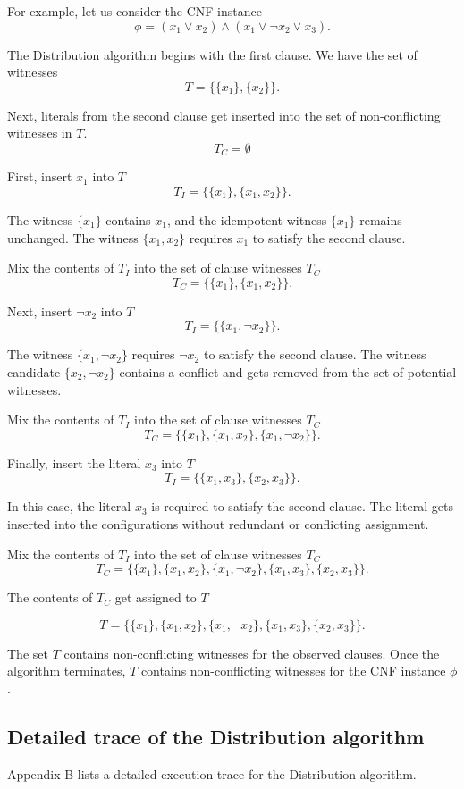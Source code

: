For example, let us consider the CNF instance
\[
\phi = (x_1 \vee x_2) \wedge (x_1 \vee \neg x_2 \vee x_3).
\]		

The Distribution algorithm begins with the first clause.  We have the set of witnesses
\[
T = \{ \{x_1\}, \{x_2\} \}.
\] 

Next, literals from the second clause get inserted into the set of non-conflicting witnesses in $T$.
\[
T_C = \emptyset
\]

\noindent First, insert $x_1$ into $T$
\[
T_I = \{ \{x_1\}, \{x_1, x_2\} \}.
\] 

\noindent The witness $\{x_1\}$ contains $x_1$, and the idempotent witness $\{x_1\}$ remains unchanged.  The witness $\{x_1, x_2\}$ requires $x_1$ to satisfy the second clause.

Mix the contents of $T_I$ into the set of clause witnesses $T_C$
\[
T_C = \{ \{x_1\}, \{x_1, x_2\} \}.
\]

\noindent Next, insert $\neg x_2$ into $T$
\[
T_I = \{ \{x_1, \neg x_2\} \}.
\] 

\noindent The witness $\{x_1, \neg x_2\}$ requires $\neg x_2$ to satisfy the second clause.  The witness candidate $\{x_2, \neg x_2\}$ contains a conflict and gets removed from the set of potential witnesses.

Mix the contents of $T_I$ into the set of clause witnesses $T_C$
\[
T_C = \{ \{x_1\}, \{x_1, x_2\}, \{x_1, \neg x_2\} \}.
\]

Finally, insert the literal $x_3$ into $T$
\[
T_I = \{ \{x_1, x_3\}, \{x_2, x_3\} \}.
\] 

\noindent In this case, the literal $x_3$ is required to satisfy the second clause.  The literal gets inserted into the configurations without redundant or conflicting assignment.

Mix the contents of $T_I$ into the set of clause witnesses $T_C$
\[
T_C = \{ \{x_1\}, \{x_1, x_2\}, \{x_1, \neg x_2\}, \{x_1, x_3\}, \{x_2, x_3\} \}.
\]

The contents of $T_C$ get assigned to $T$

\[
T = \{ \{x_1\}, \{x_1, x_2\}, \{x_1, \neg x_2\}, \{x_1, x_3\}, \{x_2, x_3\} \}.
\]

The set $T$ contains non-conflicting witnesses for the observed clauses.  Once the algorithm terminates, $T$ contains non-conflicting witnesses for the CNF instance $\phi$. 
	
	\subsection{Detailed trace of the Distribution algorithm}

Appendix B lists a detailed execution trace for the Distribution algorithm.

%
%
%	
